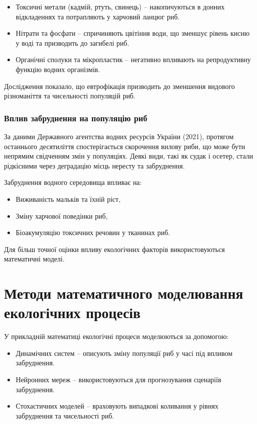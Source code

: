 \documentclass[]{iptconf}
\begin{document}
\begin{itemize}
	\item Токсичні метали (кадмій, ртуть, свинець) -- накопичуються в донних відкладеннях та потрапляють у харчовий ланцюг риб.
	\item Нітрати та фосфати -- спричиняють цвітіння води, що зменшує рівень кисню у воді та призводить до загибелі риб.
	\item Органічні сполуки та мікропластик -- негативно впливають на репродуктивну функцію водних організмів.
\end{itemize}

Дослідження \cite{Mudrak} показало, що евтрофікація призводить до зменшення видового різноманіття та чисельності популяцій риб.




\subsubsection*{Вплив забруднення на популяцію риб}


За даними Державного агентства водних ресурсів України (2021), протягом останнього десятиліття спостерігається скорочення вилову риби, що може бути непрямим свідченням змін у популяціях. Деякі види, такі як судак і осетер, стали рідкісними через деградацію місць нересту та забруднення.

Забруднення водного середовища впливає на:
\begin{itemize}
	\item Виживаність мальків та їхній ріст,
	\item Зміну харчової поведінки риб,
	\item Біоакумуляцію токсичних речовин у тканинах риб.
\end{itemize}

Для більш точної оцінки впливу екологічних факторів використовуються математичні моделі.


\section{Методи математичного моделювання екологічних процесів}

У прикладній математиці екологічні процеси моделюються за допомогою:
\begin{itemize}
	\item Динамічних систем -- описують зміну популяції риб у часі під впливом забруднення.
	\item Нейронних мереж -- використовуються для прогнозування сценаріїв забруднення.
	 \item Стохастичних моделей -- враховують випадкові коливання у рівнях забруднення та чисельності риб.
\end{itemize}
\end{document}
